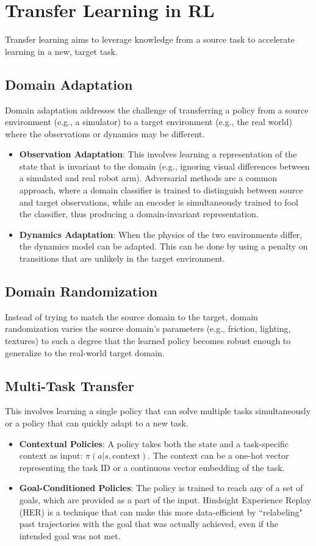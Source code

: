 \documentclass[12pt]{article}
\begin{document}
\section{Transfer Learning in RL }
Transfer learning aims to leverage knowledge from a source task to accelerate learning in a new, target task.

\subsection{Domain Adaptation}
Domain adaptation addresses the challenge of transferring a policy from a source environment (e.g., a simulator) to a target environment (e.g., the real world) where the observations or dynamics may be different.
\begin{itemize}
    \item \textbf{Observation Adaptation}: This involves learning a representation of the state that is invariant to the domain (e.g., ignoring visual differences between a simulated and real robot arm). Adversarial methods are a common approach, where a domain classifier is trained to distinguish between source and target observations, while an encoder is simultaneously trained to fool the classifier, thus producing a domain-invariant representation.
    \item \textbf{Dynamics Adaptation}: When the physics of the two environments differ, the dynamics model can be adapted. This can be done by using a penalty on transitions that are unlikely in the target environment.
\end{itemize}

\subsection{Domain Randomization}
Instead of trying to match the source domain to the target, domain randomization varies the source domain's parameters (e.g., friction, lighting, textures) to such a degree that the learned policy becomes robust enough to generalize to the real-world target domain.

\subsection{Multi-Task Transfer}
This involves learning a single policy that can solve multiple tasks simultaneously or a policy that can quickly adapt to a new task.
\begin{itemize}
    \item \textbf{Contextual Policies}: A policy takes both the state and a task-specific context as input: $\pi(a|s, \text{context})$. The context can be a one-hot vector representing the task ID or a continuous vector embedding of the task.
    \item \textbf{Goal-Conditioned Policies}: The policy is trained to reach any of a set of goals, which are provided as a part of the input. Hindsight Experience Replay (HER) is a technique that can make this more data-efficient by ``relabeling" past trajectories with the goal that was actually achieved, even if the intended goal was not met.
\end{itemize}
\end{document}
